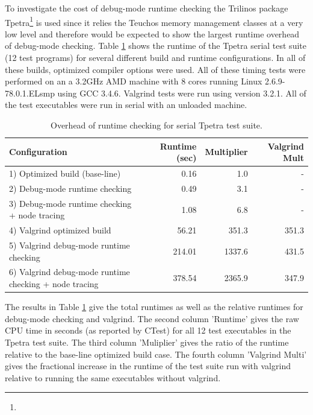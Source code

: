 \documentclass[pdf,ps2pdf,11pt]{SANDreport}
\begin{document}
To investigate the cost of debug-mode runtime checking the Trilinos
package
Tpetra\footnote{{}}
is used since it relies the Teuchos memory management classes at a
very low level and therefore would be expected to show the largest
runtime overhead of debug-mode checking.  Table
{}\ref{tbl:overhead-of-runtime-checking} shows the runtime of the
Tpetra serial test suite (12 test programs) for several different
build and runtime configurations.  In all of these builds, optimized
compiler options were used.  All of these timing tests were performed
on an a 3.2GHz AMD machine with 8 cores running Linux
2.6.9-78.0.1.ELsmp using GCC 3.4.6.  Valgrind tests were run using
version 3.2.1.  All of the test executables were run in serial with an
unloaded machine.

\begin{table}
%
\begin{center}
%
{\small\begin{tabular}{|l|r|r|r|}
\hline
Configuration
& Runtime (sec)
& Multiplier
& Valgrind Mult \\
\hline
\hline
1) Optimized build (base-line)
& 0.16
& 1.0
& - \\
\hline
2) Debug-mode runtime checking
& 0.49
& 3.1
& - \\
\hline
3) Debug-mode runtime checking + node tracing
& 1.08
& 6.8
& - \\
\hline
4) Valgrind optimized build
& 56.21
& 351.3
& 351.3 \\
\hline
5) Valgrind debug-mode runtime checking
& 214.01
& 1337.6
& 431.5 \\
\hline
6) Valgrind debug-mode runtime checking + node tracing
& 378.54
& 2365.9
& 347.9 \\
\hline
\end{tabular}}
%
\end{center}
%
\caption{\label{tbl:overhead-of-runtime-checking}
Overhead of runtime checking for serial Tpetra test suite.}
%
\end{table}

The results in Table {}\ref{tbl:overhead-of-runtime-checking} give the
total runtimes as well as the relative runtimes for debug-mode
checking and valgrind.  The second column 'Runtime' gives the raw CPU
time in seconds (as reported by CTest) for all 12 test executables in
the Tpetra test suite.  The third column 'Muliplier' gives the ratio
of the runtime relative to the base-line optimized build case.  The
fourth column 'Valgrind Multi' gives the fractional increase in the
runtime of the test suite run with valgrind relative to running the
same executables without valgrind.
\end{document}
